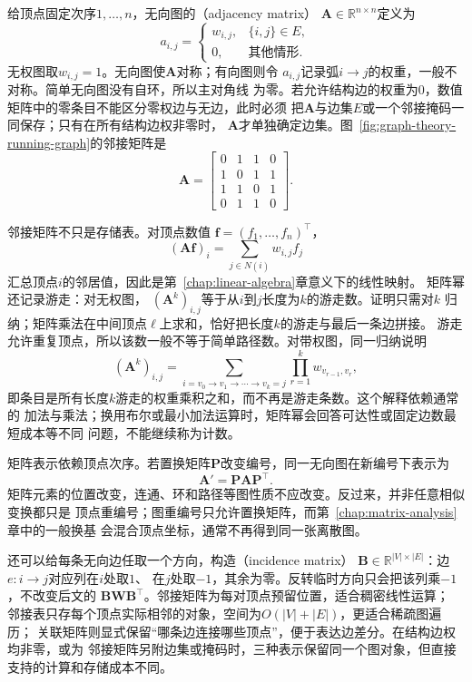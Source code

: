 给顶点固定次序\(1,\ldots,n\)，无向图的（adjacency matrix）
\(\bm{A}\in\mathbb{R}^{n\times n}\)定义为
\[
  a_{i,j}=\begin{cases}
    w_{i,j},&\{i,j\}\in E,\\
    0,&\text{其他情形}.
  \end{cases}
\]
无权图取\(w_{i,j}=1\)。无向图使\(\bm{A}\)对称；有向图则令
\(a_{i,j}\)记录弧\(i\to j\)的权重，一般不对称。简单无向图没有自环，所以主对角线
为零。若允许结构边的权重为\(0\)，数值矩阵中的零条目不能区分零权边与无边，此时必须
把\(\bm{A}\)与边集\(E\)或一个邻接掩码一同保存；只有在所有结构边权非零时，
\(\bm{A}\)才单独确定边集。图~\ref{fig:graph-theory-running-graph}的邻接矩阵是
\begin{equation}
  \bm{A}=\begin{bmatrix}
    0&1&1&0\\
    1&0&1&1\\
    1&1&0&1\\
    0&1&1&0
  \end{bmatrix}.
  \label{eq:graph-theory-running-adjacency}
\end{equation}

邻接矩阵不只是存储表。对顶点数值
\(\bm{f}=(f_1,\ldots,f_n)^{\top}\)，
\[
  (\bm{A}\bm{f})_i=\sum_{j\in N(i)}w_{i,j}f_j
\]
汇总顶点\(i\)的邻居值，因此是第~\ref{chap:linear-algebra}章意义下的线性映射。
矩阵幂还记录游走：对无权图，
\((\bm{A}^k)_{i,j}\)等于从\(i\)到\(j\)长度为\(k\)的游走数。证明只需对\(k\)
归纳；矩阵乘法在中间顶点\(\ell\)上求和，恰好把长度\(k\)的游走与最后一条边拼接。
游走允许重复顶点，所以该数一般不等于简单路径数。对带权图，同一归纳说明
\[
  (\bm{A}^k)_{i,j}
  =\sum_{i=v_0\to v_1\to\cdots\to v_k=j}
  \prod_{r=1}^{k}w_{v_{r-1},v_r},
\]
即条目是所有长度\(k\)游走的权重乘积之和，而不再是游走条数。这个解释依赖通常的
加法与乘法；换用布尔或最小加法运算时，矩阵幂会回答可达性或固定边数最短成本等不同
问题，不能继续称为计数。

矩阵表示依赖顶点次序。若置换矩阵\(\bm{P}\)改变编号，同一无向图在新编号下表示为
\begin{equation}
  \bm{A}'=\bm{P}\bm{A}\bm{P}^{\top}.
  \label{eq:graph-theory-adjacency-relabel}
\end{equation}
矩阵元素的位置改变，连通、环和路径等图性质不应改变。反过来，并非任意相似变换都只是
顶点重编号；图重编号只允许置换矩阵，而第~\ref{chap:matrix-analysis}章中的一般换基
会混合顶点坐标，通常不再得到同一张离散图。

还可以给每条无向边任取一个方向，构造（incidence matrix）
\(\bm{B}\in\mathbb{R}^{|V|\times|E|}\)：边\(e:i\to j\)对应列在\(i\)处取\(1\)、
在\(j\)处取\(-1\)，其余为零。反转临时方向只会把该列乘\(-1\)，不改变后文的
\(\bm{B}\bm{W}\bm{B}^{\top}\)。邻接矩阵为每对顶点预留位置，适合稠密线性运算；
邻接表只存每个顶点实际相邻的对象，空间为\(O(|V|+|E|)\)，更适合稀疏图遍历；
关联矩阵则显式保留“哪条边连接哪些顶点”，便于表达边差分。在结构边权均非零，或为
邻接矩阵另附边集或掩码时，三种表示保留同一个图对象，但直接支持的计算和存储成本不同。

